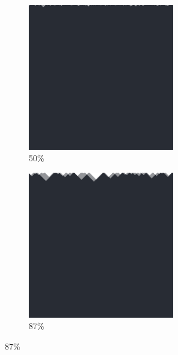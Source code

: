 \documentclass[12pt, fleqn]{report}                             %
\theoremstyle{break}                                            %
\begin{document}
\begin{figure}[h!]
\begin{subfigure}[b]{0.4\linewidth}
            \includegraphics[width=0.7\textwidth]{Images/160/c.png}
            \caption{50\%}
          \end{subfigure}
          \begin{subfigure}[b]{0.4\linewidth}
            \includegraphics[width=0.7\textwidth]{Images/160/d.png}
            \caption{87\%}
          \end{subfigure}
        \end{figure}
\end{document}
